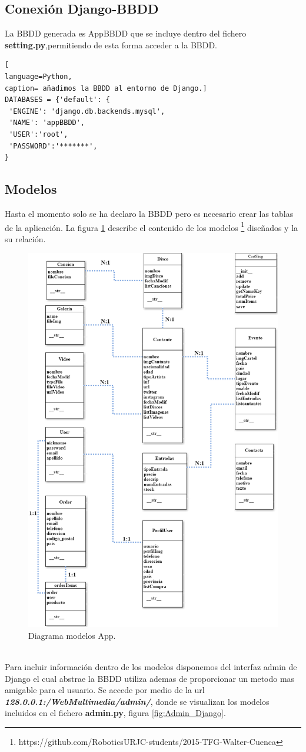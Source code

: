 \subsection*{Conexión Django-BBDD}
La BBDD generada es AppBBDD que se incluye dentro del fichero \textbf{setting.py},permitiendo de esta forma acceder a la BBDD.
\begin{lstlisting}[
language=Python,
caption= añadimos la BBDD al entorno de Django.]
DATABASES = {'default': {
 'ENGINE': 'django.db.backends.mysql',
 'NAME': 'appBBDD',
 'USER':'root',
 'PASSWORD':'*******',
}
\end{lstlisting}
\subsection*{Modelos}
Hasta el momento solo se ha declaro la BBDD pero es necesario crear las tablas de la aplicación. La figura \ref{fig:Diagrama_modelos} describe el contenido de los modelos \footnote{https://github.com/RoboticsURJC-students/2015-TFG-Walter-Cuenca} diseñados y la su relación.
\begin{figure}[!h]
\begin{center}
   \includegraphics[width=0.45\linewidth]{Figures/Diagrama_modelos}
  \decoRule
  \caption[Diagrama modelos App.]{Diagrama modelos App.}
\label{fig:Diagrama_modelos}
\end{center}
\end{figure}
\\Para incluir información dentro de los modelos disponemos del interfaz admin de Django el cual abstrae la BBDD utiliza ademas de proporcionar un metodo mas amigable para el usuario. Se accede por medio de la url \textit{\textbf{128.0.0.1:/WebMultimedia/admin/}}, donde se visualizan los modelos incluidos en el fichero \textbf{admin.py}, figura \ref{fig:Admin_Django}.
